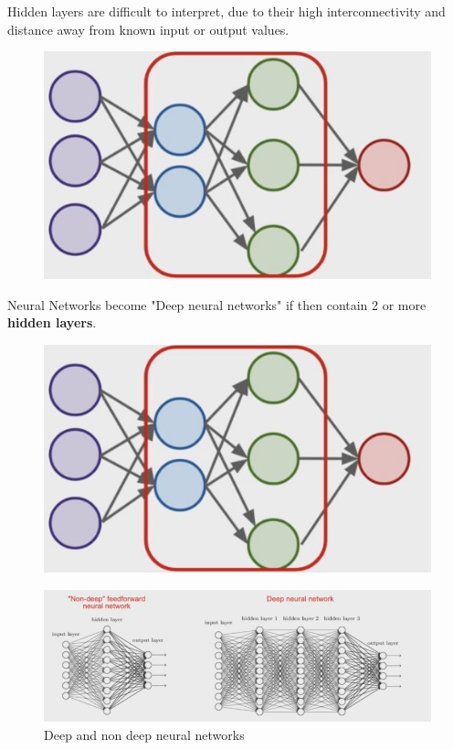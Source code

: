 \documentclass[12pt]{article}
\begin{document}
Hidden layers are difficult to interpret, due to their high interconnectivity and distance away from known input or output values.
\begin{figure}[htbp]	\centerline{\includegraphics[scale=.5]{img/hiddenLayer.jpg}}
\end{figure}

Neural Networks become "Deep neural networks" if then contain 2 or more \textbf{hidden layers}.
\begin{figure}[htbp]	\centerline{\includegraphics[scale=.5]{img/hiddenLayer.jpg}}
\end{figure}


\begin{figure}[htbp]	\centerline{\includegraphics[scale=.52]{img/deep_and_none_deep.jpg}}
\caption{Deep and non deep neural networks}
\end{figure}
\newpage
\end{document}
